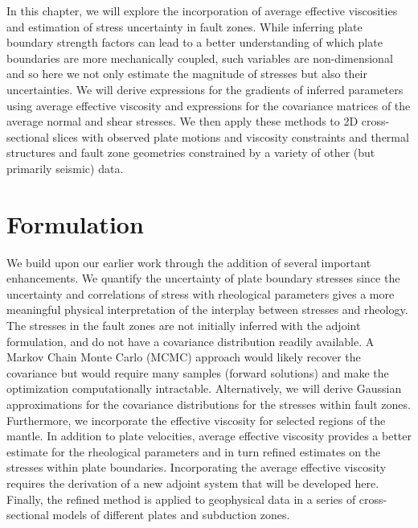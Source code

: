 \documentclass[12pt]{article}
\begin{document}
In this chapter, we will explore the incorporation of average effective viscosities and estimation of stress uncertainty in fault zones. While inferring plate boundary strength factors \citep{ratnaswamy2015adjoint} can lead to a better understanding of which plate boundaries are more mechanically coupled, such variables are non-dimensional and so here we not only estimate the magnitude of  stresses but also their uncertainties. We will derive expressions for the gradients of inferred parameters using average effective viscosity and expressions for the covariance matrices of the average normal and shear stresses. We then apply these methods to 2D cross-sectional slices with observed plate motions and viscosity constraints and thermal structures and fault zone geometries constrained by a variety of other (but primarily seismic) data.
 


\section{Formulation}
We build upon our earlier work \citep{ratnaswamy2015adjoint} through the addition of several important enhancements. We quantify the uncertainty of plate boundary stresses since the uncertainty and correlations of stress with rheological parameters gives a more meaningful physical interpretation of the interplay between stresses and rheology. The stresses in the fault zones are not initially inferred with the adjoint formulation, and do not have a covariance distribution readily available. A Markov Chain Monte Carlo (MCMC) approach would likely recover the covariance but would require many samples (forward solutions) and make the optimization computationally intractable. Alternatively, we will derive Gaussian approximations for the covariance distributions for the stresses within fault zones.
Furthermore, we incorporate the effective viscosity for selected regions of the mantle. 
In addition to plate velocities, average effective viscosity provides a better estimate for the rheological parameters and in turn refined estimates on the stresses within plate boundaries. Incorporating the average effective viscosity requires the derivation of a new adjoint system that will be developed here. 
Finally, the refined method is applied to geophysical data in a series of cross-sectional models of different plates and subduction zones.
\end{document}
